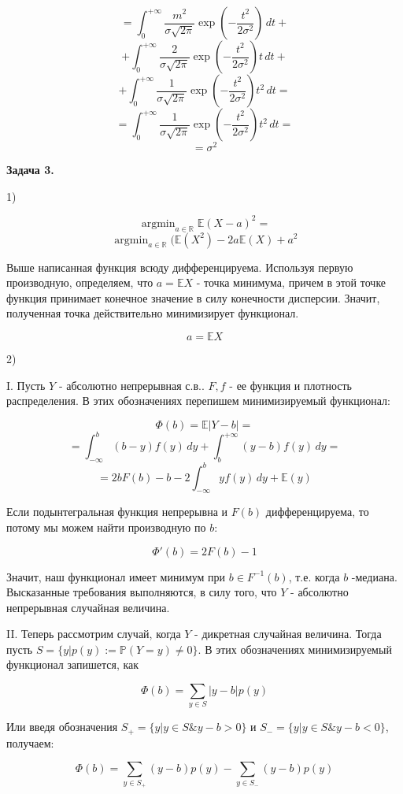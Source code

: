 \documentclass[12pt]{article}
\DeclareMathOperator*{\argmin}{argmin}
\begin{document}
$$= \int_{0}^{+\infty}\frac{m^2}{\sigma \sqrt{2\pi}}\exp\left(-\frac{t^2}{2\sigma^2}\right)\,dt+$$
$$+\int_{0}^{+\infty}\frac{2}{\sigma \sqrt{2\pi}}\exp\left(-\frac{t^2}{2\sigma^2}\right)t\,dt+$$
$$+\int_{0}^{+\infty}\frac{1}{\sigma \sqrt{2\pi}}\exp\left(-\frac{t^2}{2\sigma^2}\right)t^2\,dt=$$
$$=\int_{0}^{+\infty}\frac{1}{\sigma \sqrt{2\pi}}\exp\left(-\frac{t^2}{2\sigma^2}\right)t^2\,dt=$$
$$= \sigma^2$$

\begin{center}
\textbf{Задача 3.}
\end{center}

1)

$$\argmin _{a \in \mathbb{R}}\mathbb{E}(X-a)^2 = $$
$$\argmin _{a \in \mathbb{R}}(\mathbb{E}(X^2)-2a\mathbb{E}(X) + a^2$$

Выше написанная функция всюду дифференцируема. Используя первую производную, определяем, что $a = \mathbb{E}X$ - точка минимума, причем в этой точке функция принимает конечное значение в силу конечности дисперсии. Значит, полученная точка действительно минимизирует функционал.

$$\boxed{a = \mathbb{E}X}$$

2) 

I. Пусть $Y$ - абсолютно непрерывная с.в.. $F, f$ - ее функция и плотность распределения. В этих обозначениях перепишем минимизируемый функционал:

$$\Phi(b) = \mathbb{E}|Y-b|=$$
$$= \int_{-\infty}^{b}(b-y)f(y)\,dy + \int_{b}^{+\infty}(y-b)f(y)\,dy=$$
$$=2bF(b)-b-2\int_{-\infty}^byf(y)\,dy+\mathbb{E}(y)$$

Если подынтегральная функция непрерывна и $F(b)$ дифференцируема, то потому мы можем найти производную по $b$:

$$\Phi'(b) = 2F(b)-1$$

Значит, наш функционал имеет минимум при $b \in F^{-1}(b)$, т.е. когда $b$ -медиана. Высказанные требования выполняются, в силу того, что $Y$ - абсолютно непрерывная случайная величина.

II. Теперь рассмотрим случай, когда $Y$ - дикретная случайная величина. Тогда пусть $S = \{y|p(y):=\mathbb{P}(Y = y)\neq 0\}$. В этих обозначениях минимизируемый функционал запишется, как

$$\Phi(b) = \sum\limits_{y \in S}|y-b|p(y)$$

Или введя обозначения $S_+ = \{y|y\in S\& y-b > 0\}$ и $S_- = \{y|y\in S\& y-b < 0\}$, получаем:

$$\Phi(b) = \sum\limits_{y \in S_+}(y-b)p(y) - \sum\limits_{y \in S_-}(y-b)p(y)$$
\end{document}
